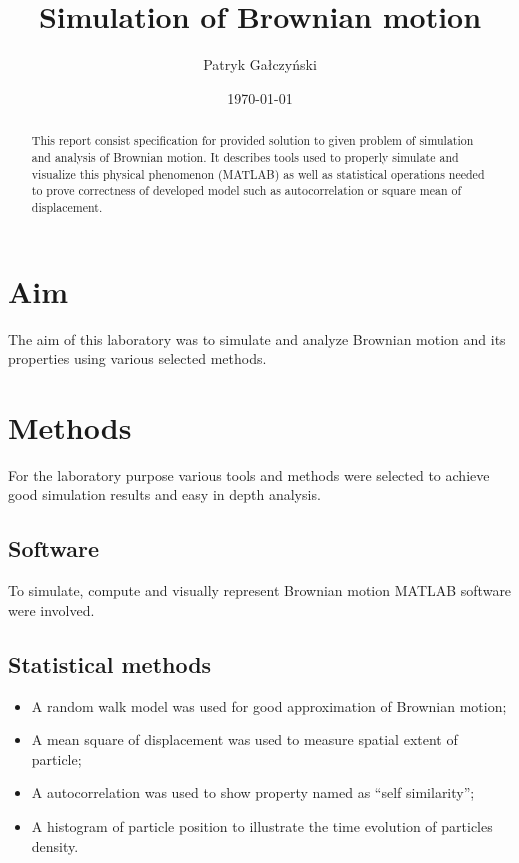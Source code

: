 \documentclass[onecolumn]{article}
\title{\spacecaps{Lab report: Lab 1-2 }\\
Simulation of Brownian motion\\\normalsize \spacesc{Modeling of Physical Systems} }
\author{Patryk Gałczyński}
\date{\today}
\begin{document}

\maketitle

\begin{abstract}
This report consist specification for provided solution to given problem of simulation and analysis of Brownian motion. It describes tools used to properly simulate and visualize this physical phenomenon (MATLAB) as well as statistical operations needed to prove correctness of developed model such as autocorrelation or square mean of displacement.   
\end{abstract}


\section{Aim}
\large
The aim of this laboratory was to simulate and analyze Brownian motion and its properties using various selected methods. 


\section{Methods}
For the laboratory purpose various tools and methods were selected to achieve good simulation results and easy in depth analysis.

\subsection{Software}
To simulate, compute and visually represent Brownian motion MATLAB software were involved.
\subsection{Statistical methods}
\begin{itemize}
	\item A random walk model was used for good approximation of Brownian motion;
    \item A mean square of displacement was used to measure spatial extent of particle;
    \item A autocorrelation was used to show property named as ``self similarity'';
    \item A histogram of particle position to illustrate the time evolution of particles density.
\end{itemize}
\end{document}
